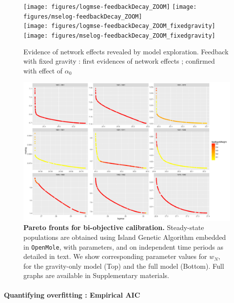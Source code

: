 \documentclass[Royal,sageh,times]{sagej}
\begin{document}
\begin{figure}
\centering
\texttt{[image: figures/logmse-feedbackDecay\_ZOOM]}
\texttt{[image: figures/mselog-feedbackDecay\_ZOOM]}\\
\texttt{[image: figures/logmse-feedbackDecay\_ZOOM\_fixedgravity]}
\texttt{[image: figures/mselog-feedbackDecay\_ZOOM\_fixedgravity]}
\caption{Evidence of network effects revealed by model exploration. Feedback with fixed gravity : first evidences of network effects ; confirmed with effect of $\alpha_0$}
\end{figure}






\begin{figure}
\centering
\includegraphics[width=\textwidth]{figures/allperiods_feedbackWeight}
\caption{\textbf{Pareto fronts for bi-objective calibration.} Steady-state populations are obtained using Island Genetic Algorithm embedded in \texttt{OpenMole}, with parameters, and on independent time periods as detailed in text. We show  corresponding parameter values for $w_N$, for the gravity-only model (Top) and the full model (Bottom). Full graphs are available in Supplementary materials.}
\end{figure}



\paragraph{Quantifying overfitting : Empirical AIC}

\end{document}
